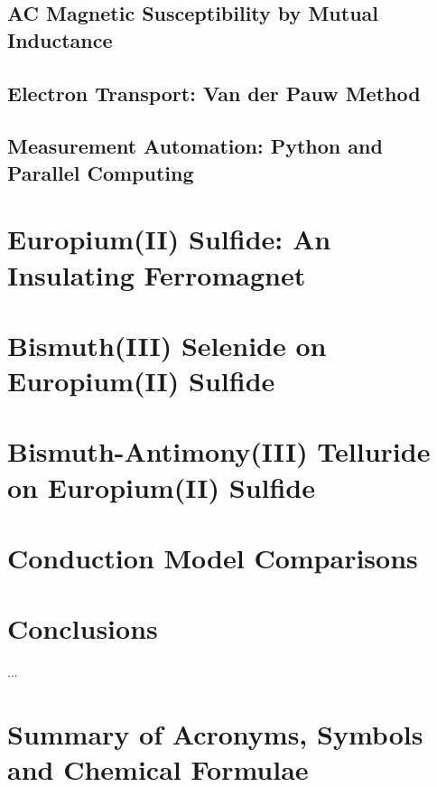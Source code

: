 \documentclass{report}
\begin{document}
    \section{AC Magnetic Susceptibility by Mutual Inductance}
    \section{Electron Transport: Van der Pauw Method}
    \section{Measurement Automation: Python and Parallel Computing}

\chapter{Europium(II) Sulfide: An Insulating Ferromagnet}
\label{ch:EuS}

\chapter{Bismuth(III) Selenide on Europium(II) Sulfide}
\label{ch:bilayer2014}


\chapter{Bismuth-Antimony(III) Telluride on Europium(II) Sulfide}
\label{ch:bilayer2018}

\chapter{Conduction Model Comparisons}
\label{ch:models}

\chapter{Conclusions}
\label{ch:conclusions}
     ...
\appendix
\chapter{Summary of Acronyms, Symbols and Chemical Formulae}
    

\printbibliography
\end{document}
